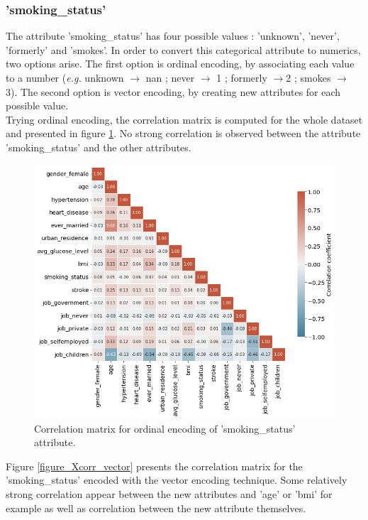 \subsubsection{'smoking\_status'}
The attribute 'smoking\_status' has four possible values : 'unknown', 'never', 'formerly' and 
'smokes'. In order to convert this categorical attribute to numerics, two options arise. The first 
option is ordinal encoding, by associating each value to a number (\textit{e.g.} unknown 
$\rightarrow$ nan ; never $\rightarrow$ 1 ; formerly $\rightarrow$2 ; smokes $\rightarrow$ 3). The 
second option is vector encoding, by creating new attributes for each possible value.\\

Trying ordinal encoding, the correlation matrix is computed for the whole dataset and presented in 
figure \ref{figure_Xcorr_ordinal}. No strong correlation is observed between the attribute 
'smoking\_status' and the other attributes.

\begin{figure}[H]
\centering
\includegraphics[scale=0.5]{../figures/correlationMatrix_smokingOrdinalEncoding.png}
\caption{Correlation matrix for ordinal encoding of 'smoking\_status' attribute.}
\label{figure_Xcorr_ordinal}
\end{figure}

Figure \ref{figure_Xcorr_vector} presents the correlation matrix for the 'smoking\_status' encoded 
with the vector encoding technique. Some relatively strong correlation appear between the new 
attributes and 'age' or 'bmi' for example as well as correlation between the new attribute 
themselves. 

